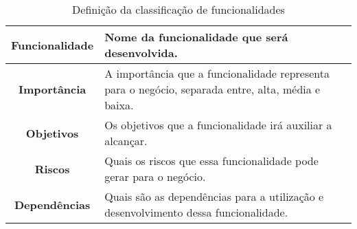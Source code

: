       \begin{table}[h!]
        \centering
        \begin{tabular}{|c|p{10cm}|}
          \hline
          \textbf{Funcionalidade} &
          Nome da funcionalidade que será desenvolvida. \\ \hline
          \textbf{Importância} &
          A importância que a funcionalidade representa para o negócio, separada
          entre, alta, média e baixa. \\ \hline
          \textbf{Objetivos} &
          Os objetivos que a funcionalidade irá auxiliar a alcançar. \\ \hline
          \textbf{Riscos} &
          Quais os riscos que essa funcionalidade pode gerar para o negócio. \\ \hline
          \textbf{Dependências} &
          Quais são as dependências para a utilização e desenvolvimento dessa
          funcionalidade. \\ \hline
        \end{tabular}
        \caption{Definição da classificação de funcionalidades}
        \label{Tabela:1}
      \end{table}

